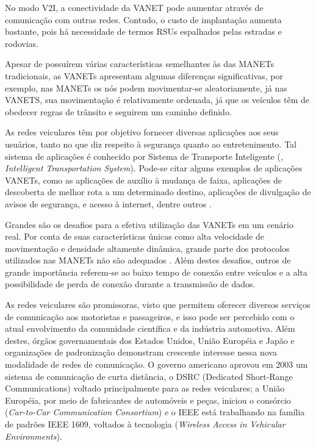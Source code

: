 No modo V2I, a conectividade da VANET pode aumentar através de comunicação com
outras redes. Contudo, o custo de implantação aumenta bastante, pois há
necessidade de termos RSUs espalhados pelas estradas e rodovias.

Apesar de possuírem várias características semelhantes às das MANETs
tradicionais, as VANETs apresentam algumas diferenças significativas, por
exemplo, nas MANETs os nós podem movimentar-se aleatoriamente, já nas VANETS,
sua movimentação é relativamente ordenada, já que os veículos têm de obedecer
regras de trânsito e seguirem um caminho definido.

As redes veiculares têm por objetivo fornecer diversas aplicações aos seus
usuários, tanto no que diz respeito à segurança quanto ao entretenimento. Tal
sistema de aplicações é conhecido por Sistema de Transporte Inteligente
(, \textit{Intelligent
Transportation System}). Pode-se citar alguns exemplos de aplicações
VANETs, como as aplicações de auxílio à mudança de faixa, aplicações de
descoberta de melhor rota a um determinado destino, aplicações de divulgação de
avisos de segurança, e acesso à internet, dentre outros \cite{li2007routing}.

Grandes são os desafios para a efetiva utilização das VANETs em um cenário
real. Por conta de suas características únicas como alta velocidade de
movimentação e densidade altamente dinâmica, grande parte dos protocolos
utilizados nas MANETs não são adequados \cite{taha2007vanet}. Além destes
desafios, outros de grande importância referem-se ao baixo tempo de conexão
entre veículos e a alta possibilidade de perda de conexão durante a
transmissão de dados.

As redes veiculares são promissoras, visto que permitem oferecer diversos
serviços de comunicação aos motoristas e passageiros, e isso pode ser percebido
com o atual envolvimento da comunidade científica e da indústria automotiva.
Além destes, órgãos governamentais dos Estados Unidos, União Européia e Japão e
organizações de padronização demonstram crescente interesse nessa nova
modalidade de redes de comunicação. O governo americano aprovou em $2003$ um
sistema de comunicação de curta distância, o DSRC (Dedicated
Short-Range Communications) voltado principalmente para as redes veiculares;
a União Européia, por meio de fabricantes de automóveis e peças, iniciou o
consórcio 
(\textit{Car-to-Car Communication Consortium}) e o IEEE está trabalhando na
família de padrões IEEE 1609, voltados à tecnologia
(\textit{Wireless Access in Vehicular Environments}).

